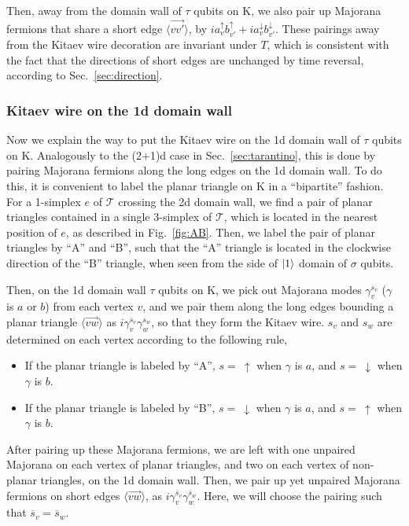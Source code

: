 \documentclass[12pt]{article}
\numberwithin{equation}{section}
\begin{document}
Then, away from the domain wall of $\tau$ qubits on $\mathrm{K}$, we also pair up Majorana fermions that share a short edge $\langle \overrightarrow{vv'}\rangle$, by $ia_v^{\uparrow}b_{v'}^{\uparrow}+ia_v^{\downarrow}b_{v'}^{\downarrow}$. These pairings away from the Kitaev wire decoration are invariant under $T$, which is consistent with the fact that the directions of short edges are unchanged by time reversal, according to Sec.~\ref{sec:direction}.

\subsubsection{Kitaev wire on the 1d domain wall}
Now we explain the way to put the Kitaev wire on the 1d domain wall of $\tau$ qubits on $\mathrm{K}$. Analogously to the (2+1)d case in Sec.~\ref{sec:tarantino}, this is done by pairing Majorana fermions along the long edges on the 1d domain wall. 
To do this, it is convenient to label the planar triangle on $\mathrm{K}$ in a ``bipartite'' fashion. For a 1-simplex $e$ of $\mathcal{T}$ crossing the 2d domain wall, we find a pair of planar triangles contained in a single 3-simplex of $\mathcal{T}$, which is located in the nearest position of $e$, as described in Fig.~\ref{fig:AB}.
Then, we label the pair of planar triangles by ``A'' and ``B'', such that the ``A'' triangle is located in the clockwise direction of the ``B'' triangle, when seen from the side of $\ket{1}$ domain of $\sigma$ qubits.

Then, on the 1d domain wall $\tau$ qubits on $\mathrm{K}$, we pick out Majorana modes $\gamma_v^{s_v}$ ($\gamma$ is $a$ or $b$) from each vertex $v$, and we pair them along the long edges bounding a planar triangle $\langle \overrightarrow{vw}\rangle$ as $i\gamma_v^{s_v}\gamma_{w}^{s_w}$, so that they form the Kitaev wire. $s_v$ and $s_w$ are determined on each vertex according to the following rule,
\begin{itemize}
\item If the planar triangle is labeled by ``A'', $s=\ \uparrow$ when $\gamma$ is $a$, and $s=\ \downarrow$ when $\gamma$ is $b$.
\item If the planar triangle is labeled by ``B'', $s=\ \downarrow$ when $\gamma$ is $a$, and $s=\ \uparrow$ when $\gamma$ is $b$.
\end{itemize}

After pairing up these Majorana fermions, we are left with one unpaired Majorana on each vertex of planar triangles, and two on each vertex of non-planar triangles, on the 1d domain wall. 
Then, we pair up yet unpaired Majorana fermions on short edges $\langle \overrightarrow{vw}\rangle$, as $i\gamma_v^{\overline{s}_v}\gamma_{w}^{\overline{s}_w}$. 
Here, we will choose the pairing such that $\overline{s}_v=\overline{s}_w$.
\end{document}
